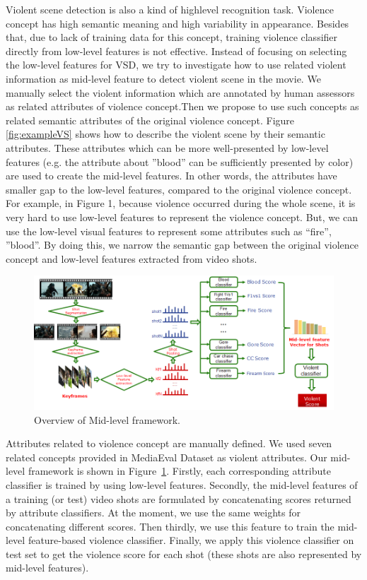 \documentclass[twocolumn]{bmcart}%
\begin{document}
Violent scene detection is also a kind of highlevel recognition task. Violence concept has high semantic meaning and high
variability in appearance. Besides that, due to lack of training data for this concept, training violence classifier directly
from low-level features is not effective. Instead of focusing on selecting the low-level features for VSD, we try to investigate how to use related violent information as mid-level feature to detect violent scene in the movie. We manually select the violent information which are annotated by human assessors as related attributes of violence concept.Then we propose to use such concepts as related semantic attributes of the original violence concept. Figure \ref{fig:exampleVS} shows how to describe the violent scene by their semantic attributes. These attributes which can be more well-presented by low-level features (e.g. the attribute about ”blood” can be sufficiently presented by color) are used to create the mid-level features. In other words, the attributes have smaller gap to the low-level features, compared to the original violence concept. For example, in Figure 1, because violence occurred during the whole scene, it is very hard to use low-level features to represent the violence concept. But, we can use the low-level visual features to represent some attributes such as “fire”, ”blood”. By doing this, we narrow the semantic gap between the original violence concept and low-level features extracted from video shots.
\begin{figure}[!t]
	\centering
	\includegraphics[width=2\linewidth]{Images/Mid-level.png}
	\caption{Overview of Mid-level framework.}
	\label{fig:mid-level}
\end{figure}
Attributes related to violence concept are manually defined. We used seven related concepts provided in MediaEval Dataset as violent attributes. Our mid-level framework is shown in Figure~\ref{fig:mid-level}. Firstly, each corresponding attribute classifier is trained by using low-level features. Secondly, the mid-level features of a training (or test) video shots are formulated by concatenating scores returned by attribute classifiers. At the moment, we use the same weights for concatenating different scores. Then thirdly, we use this feature to train the mid-level feature-based violence classifier.  Finally, we apply this violence classifier on test set to get the violence score for each shot (these shots are also represented by mid-level features).
\end{document}
